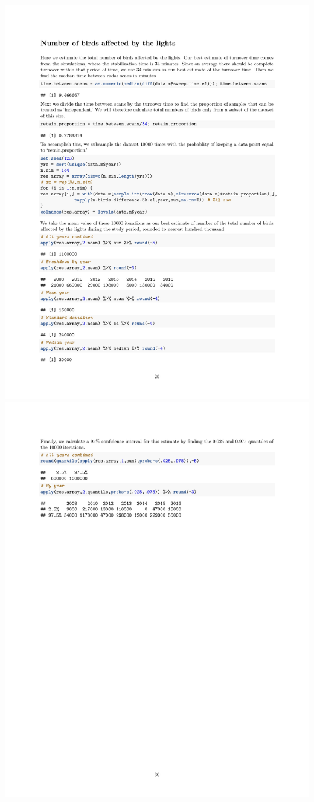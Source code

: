 \documentclass[a4paper, twoside]{templates/ociamthesis}
\begin{document}
\includegraphics[width=1\linewidth]{pdf_chapters/lights/lights_supp_crop_Part63}
\includegraphics[width=1\linewidth]{pdf_chapters/lights/lights_supp_crop_Part64}
\end{document}
